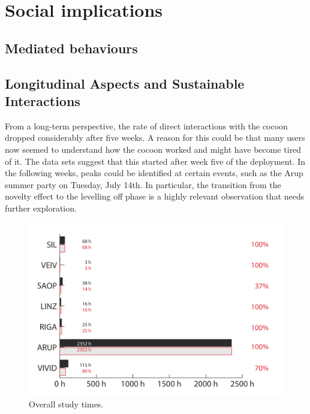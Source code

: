\section{Social implications}



\subsection{Mediated behaviours}

\subsection{Longitudinal Aspects and Sustainable Interactions}



From a long-term perspective, the rate of direct interactions with the cocoon dropped considerably after five weeks. 
A reason for this could be that many users now seemed to understand how the cocoon worked and might have become tired of it. 
The data sets suggest that this started after week five of the deployment.
In the following weeks, peaks could be identified at certain events, such as the Arup summer party on Tuesday, July 14th. 
In particular, the transition from the novelty effect to the levelling off phase is a highly relevant observation that needs further exploration.



\begin{figure}[!h] 
\centering
\includegraphics[width=\textwidth]{Illustrations/OverallStudyTimes.png}
\caption [Overall study times] {Overall study times.}
\label{OverallStudyTimes}
\end{figure}



